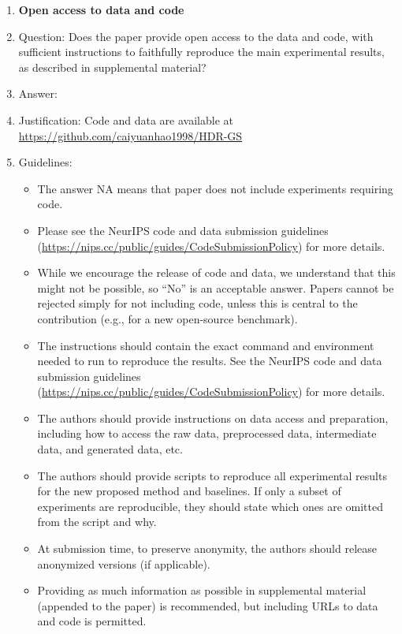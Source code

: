 \documentclass{article}
\begin{document}
\begin{enumerate}
\item {\bf Open access to data and code}
    \item[] Question: Does the paper provide open access to the data and code, with sufficient instructions to faithfully reproduce the main experimental results, as described in supplemental material?
    \item[] Answer: \answerYes{} %
    \item[] Justification: Code and data are available at \url{https://github.com/caiyuanhao1998/HDR-GS}
    \item[] Guidelines:
    \begin{itemize}
        \item The answer NA means that paper does not include experiments requiring code.
        \item Please see the NeurIPS code and data submission guidelines (\url{https://nips.cc/public/guides/CodeSubmissionPolicy}) for more details.
        \item While we encourage the release of code and data, we understand that this might not be possible, so “No” is an acceptable answer. Papers cannot be rejected simply for not including code, unless this is central to the contribution (e.g., for a new open-source benchmark).
        \item The instructions should contain the exact command and environment needed to run to reproduce the results. See the NeurIPS code and data submission guidelines (\url{https://nips.cc/public/guides/CodeSubmissionPolicy}) for more details.
        \item The authors should provide instructions on data access and preparation, including how to access the raw data, preprocessed data, intermediate data, and generated data, etc.
        \item The authors should provide scripts to reproduce all experimental results for the new proposed method and baselines. If only a subset of experiments are reproducible, they should state which ones are omitted from the script and why.
        \item At submission time, to preserve anonymity, the authors should release anonymized versions (if applicable).
        \item Providing as much information as possible in supplemental material (appended to the paper) is recommended, but including URLs to data and code is permitted.
    \end{itemize}



\end{enumerate}
\end{document}
